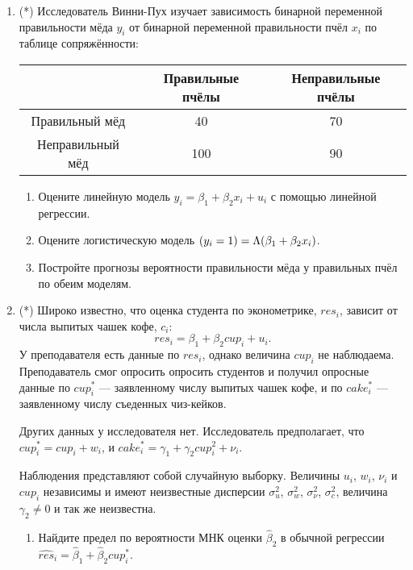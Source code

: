 \documentclass[12pt]{article}
\let\P\relax
\DeclareMathOperator{\P}{\mathbb{P}}
\begin{document}
\begin{enumerate}
    
\newpage
    \item (*) Исследователь Винни-Пух изучает зависимость бинарной переменной правильности мёда $y_i$ 
    от бинарной переменной правильности пчёл $x_i$ по таблице сопряжённости:

    \begin{tabular}{ccc}
        \toprule 
         & Правильные пчёлы & Неправильные пчёлы \\
        \midrule
        Правильный мёд & 40 & 70 \\
        Неправильный мёд & 100 & 90 \\
        \bottomrule
    \end{tabular}
    
    \begin{enumerate}
        \item Оцените линейную модель $y_i = \beta_1 + \beta_2 x_i + u_i$ с помощью линейной регрессии. 
        \item Оцените логистическую модель $\P(y_i = 1) = \Lambda(\beta_1 + \beta_2 x_i)$. 
        \item Постройте прогнозы вероятности правильности мёда у правильных пчёл по обеим моделям. 
    \end{enumerate}

\item (*) Широко известно, что оценка студента по эконометрике, $res_i$, зависит от числа выпитых чашек кофе, $c_i$:
\[
res_i = \beta_1 + \beta_2 cup_i + u_i.
\]
У преподавателя есть данные по $res_i$, однако величина $cup_i$ не наблюдаема. 
Преподаватель смог опросить опросить студентов и получил опросные данные по $cup_i^*$ —
заявленному числу выпитых чашек кофе, и по $cake_i^*$ — заявленному числу съеденных чиз-кейков. 

Других данных у исследователя нет. Исследователь предполагает, что $cup_i^* = cup_i + w_i$, и
$cake_i^* = \gamma_1 + \gamma_2 cup^2_i + \nu_i$. 


Наблюдения представляют собой случайную выборку. 
Величины $u_i$, $w_i$, $\nu_i$ и $cup_i$ независимы и имеют неизвестные дисперсии $\sigma^2_u$, $\sigma^2_w$,
$\sigma^2_{\nu}$, $\sigma^2_c$, величина $\gamma_2 \neq 0$ и так же неизвестна. 



\begin{enumerate}
    \item Найдите предел по вероятности МНК оценки $\hat\beta_2$ 
    в обычной регрессии $\widehat{res}_i = \hat\beta_1 + \hat\beta_2 cup_i^*$. 


\end{enumerate}
\end{enumerate}
\end{document}
